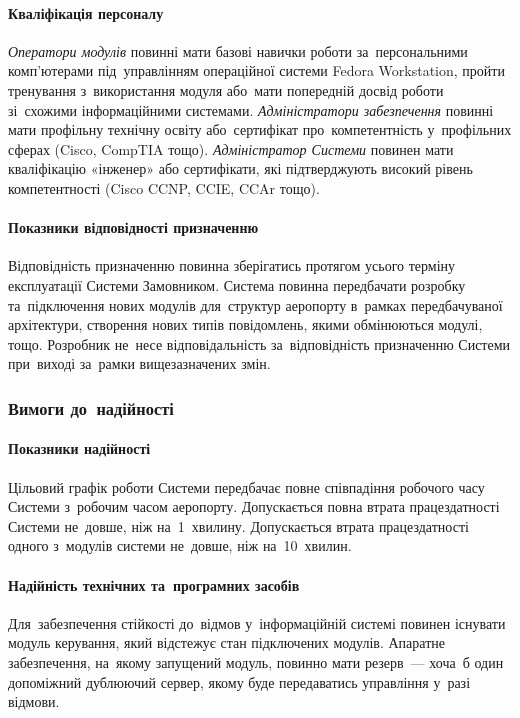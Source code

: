 \documentclass[
	a4paper,
	oneside,
	BCOR = 10mm,
	DIV = 12,
	12pt,
	headings = normal,
]{scrartcl}
\begin{document}
				\paragraph{Кваліфікація персоналу}
					\emph{Оператори модулів} повинні мати базові навички роботи за~персональними комп'\-ю\-те\-ра\-ми під~управлінням операційної системи Fedora Workstation, пройти тренування з~використання модуля або~мати попередній досвід роботи зі~схожими інформаційними системами. \emph{Адміністратори забезпечення} повинні мати профільну технічну освіту або~сертифікат про~компетентність у~профільних сферах (Cisco, CompTIA тощо). \emph{Адміністратор Системи} повинен мати кваліфікацію «інженер» або сертифікати, які підтверджують високий рівень компетентності (Cisco CCNP, CCIE, CCAr тощо).

				\paragraph{Показники відповідності призначенню}
					Відповідність призначенню повинна зберігатись протягом усього терміну експлуатації Системи Замовником. Система повинна передбачати розробку та~підключення нових модулів для~структур аеропорту в~рамках передбачуваної архітектури, створення нових типів повідомлень, якими обмінюються модулі, тощо. Розробник не~несе відповідальність за~відповідність призначенню Системи при~виході за~рамки вищезазначених змін.
				
			\subsubsection{Вимоги до~надійності}
				\paragraph{Показники надійності}
					Цільовий графік роботи Системи передбачає повне співпадіння робочого часу Системи з~робочим часом аеропорту. Допускається повна втрата працездатності Системи не~довше, ніж на~1~хвилину. Допускається втрата працездатності одного з~модулів системи не~довше, ніж на~10~хвилин.

				\paragraph{Надійність технічних та~програмних засобів}
					Для~забезпечення стійкості до~відмов у~інформаційній системі повинен існувати модуль керування, який відстежує стан підключених модулів. Апаратне забезпечення, на~якому запущений модуль, повинно мати резерв~— хоча~б один допоміжний дублюючий сервер, якому буде передаватись управління у~разі відмови.
\end{document}
